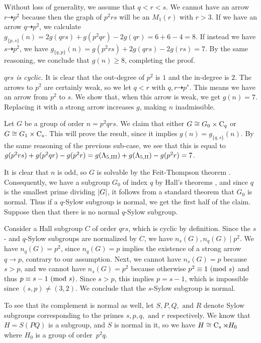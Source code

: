 Without loss of generality, we assume that $q < r < s$.
We cannot have an arrow $r \dashrightarrow p^2$ because then the graph of $p^2 r s$ will be an $M_1(r)$ with $r > 3$.
If we have an arrow $q \dashrightarrow p^2$, we calculate $g_{\{p, s\}}(n) = 2g(qrs) + g(p^2 q r) - 2g(qr) = 6 + 6 - 4 = 8.$ If instead we have $s \dashrightarrow p^2$, we have $g_{\{q, p\}}(n) = g(p^2 r s) + 2g(qrs) - 2g(rs) = 7$.
By the same reasoning, we conclude that $g(n) \ge 8$, completing the proof.

 \emph{$qrs$ is cyclic.} It is clear that the out-degree of $p^2$ is $1$ and the in-degree is $2$.
The arrows to $p^2$ are certainly weak, so we let $q < r$ with $q, r \dashrightarrow p^s$.
This means we have an arrow from $p^2$ to $s$.
We show that, when this arrow is weak, we get $g(n) = 7$.
Replacing it with a strong arrow increases $g$, making $n$ inadmissible.

Let $G$ be a group of order $n = p^2 q r s$.
We claim that either $G \cong G_0 \times \operatorname{C}_{q}$ or $G \cong G_1\times \operatorname{C}_{s}$.
This will prove the result, since it implies $g(n) = g_{\{q, s\}}(n)$.
By the same reasoning of the previous sub-case, we see that this is equal to $g(p^2 r s) + g(p^2 q r) - g(p^2 r) = g(\Lambda_{5,\text{III}}) + g(\Lambda_{5,\text{II}}) - g(p^2 r) = 7$.

It is clear that $n$ is odd, so $G$ is solvable by the Feit-Thompson theorem {\cite{oddsolve}}.
Consequently, we have a subgroup $G_0$ of index $q$ by Hall's theorems {\cite[Thm.~3.13]{fgt}}, and since $q$ is the smallest prime dividing $\lvert G\rvert$, it follows from a standard theorem {\cite[Prob.~1A.1]{fgt}} that $G_0$ is normal.
Thus if a $q$-Sylow subgroup is normal, we get the first half of the claim.
Suppose then that there is no normal $q$-Sylow subgroup.

Consider a Hall subgroup $C$ of order $qrs$, which is cyclic by definition.
Since the $s$- and $q$-Sylow subgroups are normalized by $C$, we have $n_s(G), n_q(G) \mid p^2$.
We have $n_q(G) = p^2$, since $n_q(G) = p$ implies the existence of a strong arrow \nopagebreak[4] $q \to p$, contrary to our assumption.
Next, we cannot have $n_s(G) = p$ because $s > p$, and we cannot have $n_s(G) = p^2$ because otherwise $p^2 \equiv 1 \ (\mathrm{mod} \ s)$ and thus $p \equiv s - 1 \ (\mathrm{mod} \ s)$.
Since $s > p$, this implies $p = s - 1$, which is impossible since $(s, p) \neq (3, 2)$.
We conclude that the $s$-Sylow subgroup is normal.


To see that its complement is normal as well, let $S, P, Q,\text{ and }R$ denote Sylow subgroups corresponding to the primes $s, p, q,\text{ and }r$ respectively.
We know that $H = S(PQ)$ is a subgroup, and $S$ is normal in it, so we have $H \cong \operatorname{C}_{s} \rtimes H_0$ where $H_0$ is a group of \mbox{order $p^2 q$.}

